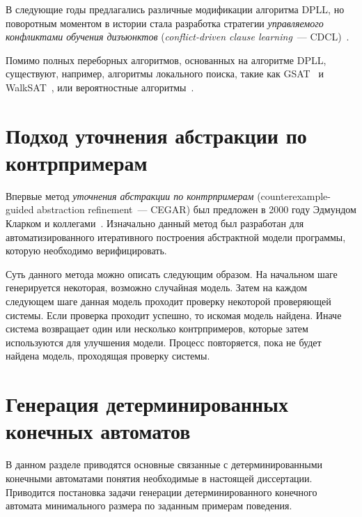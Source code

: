 В следующие годы предлагались различные модификации алгоритма DPLL, но поворотным моментом в истории стала разработка стратегии \emph{управляемого конфликтами обучения дизъюнктов} (\emph{conflict-driven clause learning}~--- CDCL)~\cite{DBLP:conf/iccad/SilvaS96,DBLP:journals/tc/Marques-SilvaS99}.

Помимо полных переборных алгоритмов, основанных на алгоритме DPLL, существуют, например, алгоритмы локального поиска, такие как GSAT~\cite{DBLP:conf/aaai/SelmanLM92} и WalkSAT~\cite{DBLP:conf/dimacs/SelmanKC93}, или вероятностные алгоритмы~\cite{DBLP:conf/focs/Schoning99}.



\section{Подход уточнения абстракции по контрпримерам}
\label{sec:review:cegar}

Впервые метод \emph{уточнения абстракции по контрпримерам} (counterexample-guided abstraction refinement~--- CEGAR) был предложен в 2000 году Эдмундом Кларком и коллегами~\cite{DBLP:conf/cav/ClarkeGJLV00}.
Изначально данный метод был разработан для автоматизированного итеративного построения абстрактной модели программы, которую необходимо верифицировать.

Суть данного метода можно описать следующим образом.
На начальном шаге генерируется некоторая, возможно случайная модель. 
Затем на каждом следующем шаге данная модель проходит проверку некоторой проверяющей системы.
Если проверка проходит успешно, то искомая модель найдена.
Иначе система возвращает один или несколько контрпримеров, которые затем используются для улучшения модели.
Процесс повторяется, пока не будет найдена модель, проходящая проверку системы.



\section{Генерация детерминированных конечных автоматов} 
\label{sec:review:dfa-inf}

В данном разделе приводятся основные связанные с детерминированными конечными автоматами понятия необходимые в настоящей диссертации.
Приводится постановка задачи генерации детерминированного конечного автомата минимального размера по заданным примерам поведения.

